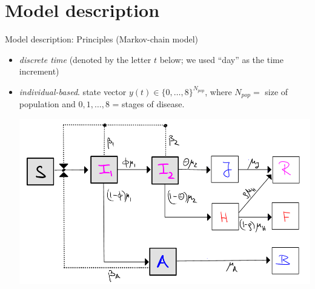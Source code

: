 \documentclass{beamer}
\begin{document}
  \section*{Model description}
  \begin{frame}{Model description: Principles (Markov-chain model)}
 \begin{itemize}
  \item[] \textit{discrete time} (denoted by the letter $t$ below; we used  ``day'' as the time increment) \pause 
  \item[] \textit{individual-based}. state  vector $y(t)\in \{0,\ldots ,8\} ^{N_{pop}}$, where  $N_{pop} =$ size of population and $0,1,\ldots ,8$ = stages of disease. \pause 
  \begin{center}
  \includegraphics[scale=0.38]{SIIAR-diagram-AARMS-1.png} 
  \end{center}  
\end{itemize}
\end{frame}
\end{document}
